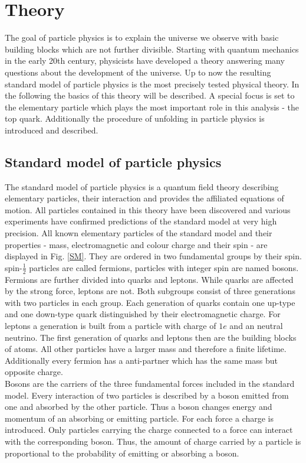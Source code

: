 \chapter{Theory}
	The goal of particle physics is to explain the universe we observe with basic building blocks which are not further divisible. Starting with quantum mechanics in the early 20th century, physicists have developed a theory answering many questions about the development of the universe. Up to now the resulting standard model of particle physics is the most precisely tested physical theory. In the following the basics of this theory will be described. A special focus is set to the elementary particle which plays the most important role in this analysis - the top quark. Additionally the procedure of unfolding in particle physics is introduced and described.
\section{Standard model of particle physics}
	The standard model of particle physics is a quantum field theory describing elementary particles, their interaction and provides the affiliated equations of motion. All particles contained in this theory have been discovered and various experiments have confirmed predictions of the standard model at very high precision. All known elementary particles of the standard model and their properties - mass, electromagnetic and colour charge and their spin - are displayed in Fig. \ref{SM}. They are ordered in two fundamental groups by their spin. spin-$\frac{1}{2}$ particles are called fermions, particles with integer spin are named bosons. 
	\\
	Fermions are further divided into quarks and leptons. While quarks are affected by the strong force, leptons are not. Both subgroups consist of three generations with two particles in each group. Each generation of quarks contain one up-type and one down-type quark distinguished by their electromagnetic charge. For leptons a generation is built from a particle with charge of $1e$ and an neutral neutrino. The first generation of quarks and leptons then are the building blocks of atoms. All other particles have a larger mass and therefore a finite lifetime. Additionally every fermion has a anti-partner which has the same mass but opposite charge. 
	\\	
	Bosons are the carriers of the three fundamental forces included in the standard model. Every interaction of two particles is described by a boson emitted from one and absorbed by the other particle. Thus a boson changes energy and momentum of an absorbing or emitting particle. For each force a charge is introduced. Only particles carrying the charge connected to a force can interact with the corresponding boson. Thus, the amount of charge carried by a particle is proportional to the probability of emitting or absorbing a boson. 
